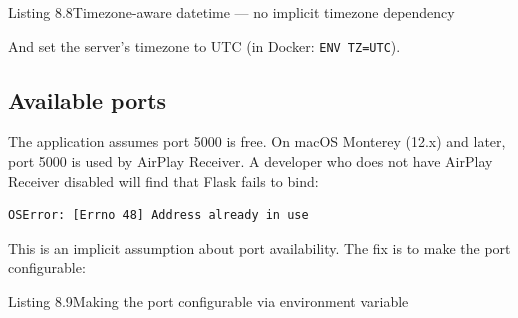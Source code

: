 \begin{codeboxcap}[short]{\textcolor{accent}{Listing 8.8}\enspace Timezone-aware datetime --- no implicit timezone dependency}

\begin{Shaded}
\begin{Highlighting}[]

\OperatorTok{=}\OperatorTok{=}
\end{Highlighting}
\end{Shaded}

\end{codeboxcap}

\noindent{}And set the server's timezone to UTC (in Docker: \texttt{ENV\ TZ=UTC}).

\subsection*{Available ports}\label{08-hidden-dependencies:available-ports}

The application assumes port 5000 is free. On macOS Monterey (12.x) and later, port 5000 is used by AirPlay Receiver. A developer who does not have AirPlay Receiver disabled will find that Flask fails to bind:

\begin{outputbox}[short]
\begin{Verbatim}[fontsize=\codesize, breaklines, breakanywhere, breaksymbolleft={\tiny\textcolor{muted}{$\hookrightarrow$}}]
OSError: [Errno 48] Address already in use
\end{Verbatim}
\end{outputbox}

\noindent{}This is an implicit assumption about port availability. The fix is to make the port configurable:

\begin{codeboxcap}[short]{\textcolor{accent}{Listing 8.9}\enspace Making the port configurable via environment variable}

\begin{Shaded}
\begin{Highlighting}[]

\OperatorTok{=} \NormalTok{, }\NormalTok{))}
\OperatorTok{=}\OperatorTok{=}\OperatorTok{=}\NormalTok{)}
\end{Highlighting}
\end{Shaded}

\end{codeboxcap}

